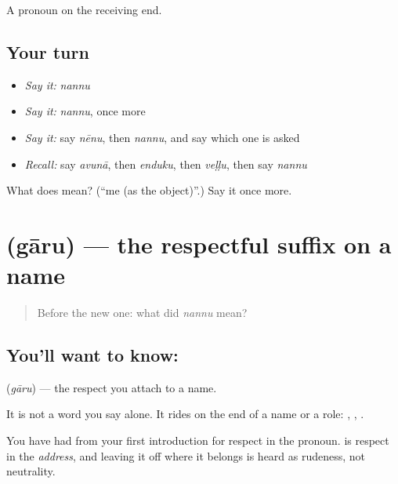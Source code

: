 \begin{grammarlens}[title={What you've built}]
A pronoun on the receiving end.
\end{grammarlens}

\subsection*{Your turn}
\begin{itemize}
\raggedright
  \item \emph{Say it:} \emph{nannu}
  \item \emph{Say it:} \emph{nannu}, once more
  \item \emph{Say it:} say \emph{nēnu}, then \emph{nannu}, and say which one is asked
  \item \emph{Recall:} say \emph{avunā}, then \emph{enduku}, then \emph{veḷḷu}, then say \emph{nannu}
\end{itemize}

\begin{tcolorbox}[breakable,colback=teal!4,colframe=teal!35!black,title={Before you move on}]
What does  mean? (\textquotedblleft{}me (as the object)\textquotedblright{}.) Say it once more.
\end{tcolorbox}
\section[\texorpdfstring{\te{గారు} (gāru)}{గారు (gāru)}]{ (gāru) — the respectful suffix on a name}

\label{lesson:TE-C79-garu}



\begin{quote}
Before the new one: what did \emph{nannu} mean?
\end{quote}

\subsection*{You'll want to know: }
\textbf{} (\emph{gāru}) — the respect you attach to a name.

It is not a word you say alone. It rides on the end of a name or a role: \textbf{ }, \textbf{ }, \textbf{ }.

You have had  from your first introduction for respect in the pronoun.  is respect in the \emph{address}, and leaving it off where it belongs is heard as rudeness, not neutrality.

